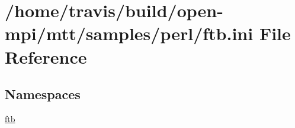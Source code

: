 \hypertarget{ftb_8ini}{\section{/home/travis/build/open-\/mpi/mtt/samples/perl/ftb.ini File Reference}
\label{ftb_8ini}
}
\subsection*{Namespaces}
\begin{DoxyCompactItemize}
\item 
\hyperlink{namespaceftb}{ftb}
\end{DoxyCompactItemize}
